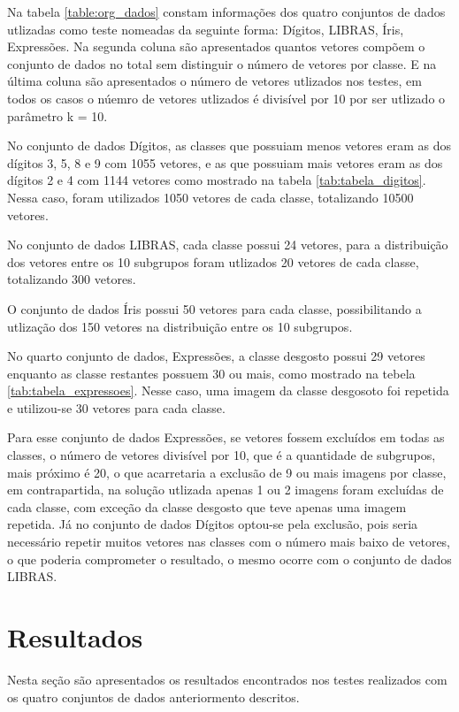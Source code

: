 Na tabela \ref{table:org_dados} constam informações dos quatro conjuntos de dados utlizadas como teste nomeadas da seguinte forma: Dígitos, LIBRAS, Íris, Expressões. Na segunda coluna são apresentados quantos vetores compõem o conjunto de dados no total sem distinguir o número de vetores por classe. E na última coluna são apresentados o número de vetores utlizados nos testes, em todos os casos o núemro de vetores utlizados é divisível por 10 por ser utlizado o parâmetro k = 10.

No conjunto de dados Dígitos, as classes que possuiam menos vetores eram as dos dígitos 3, 5, 8 e 9 com 1055 vetores, e as que possuiam mais vetores eram as dos dígitos 2 e 4 com 1144 vetores como mostrado na tabela \ref{tab:tabela_digitos}. Nessa caso, foram utilizados 1050 vetores de cada classe, totalizando 10500 vetores.

No conjunto de dados LIBRAS, cada classe possui 24 vetores, para a distribuição dos vetores entre os 10 subgrupos foram utlizados 20 vetores de cada classe, totalizando 300 vetores.

O conjunto de dados Íris possui 50 vetores para cada classe, possibilitando a utlização dos 150 vetores na distribuição entre os 10 subgrupos.

No quarto conjunto de dados, Expressões, a classe desgosto possui 29 vetores enquanto as classe restantes possuem 30 ou mais, como mostrado na tebela \ref{tab:tabela_expressoes}. Nesse caso, uma imagem da classe desgosoto foi repetida e utilizou-se 30 vetores para cada classe. 

Para esse conjunto de dados Expressões, se vetores fossem excluídos em todas as classes, o número de vetores divisível por 10, que é a quantidade de subgrupos, mais próximo é 20, o que acarretaria a exclusão de 9 ou mais imagens por classe, em contrapartida, na solução utlizada apenas 1 ou 2 imagens foram excluídas de cada classe, com exceção da classe desgosto que teve apenas uma imagem repetida. Já no conjunto de dados Dígitos optou-se pela exclusão, pois seria necessário repetir muitos vetores nas classes com o número mais baixo de vetores, o que poderia comprometer o resultado, o mesmo ocorre com o conjunto de dados LIBRAS.

\section{Resultados}
Nesta seção são apresentados os resultados encontrados nos testes realizados com os quatro conjuntos de dados anteriormento descritos. 

